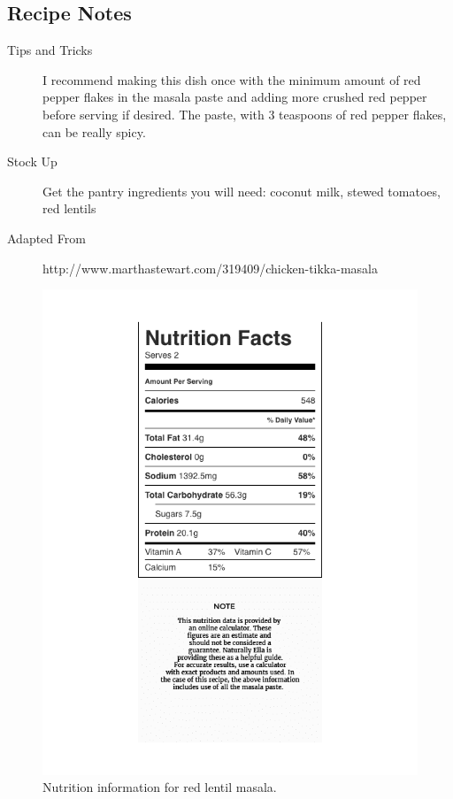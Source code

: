 \subsection{Recipe Notes}
\begin{description}
  \item [Tips and Tricks] I recommend making this dish once with the minimum amount of red pepper flakes in the masala paste and adding more crushed red pepper before serving if desired. The paste, with 3 teaspoons of red pepper flakes, can be really spicy.
  \item [Stock Up] Get the pantry ingredients you will need: coconut milk, stewed tomatoes, red lentils
  \item [Adapted From] http://www.marthastewart.com/319409/chicken-tikka-masala
\end{description}

\begin{figure}[h!]
    \centering
    \includegraphics[width=.25\textwidth]{img/red-lentil-masala.png}
    \caption{Nutrition information for red lentil masala.}
    \label{fig:red-lentil-masala}
\end{figure}

